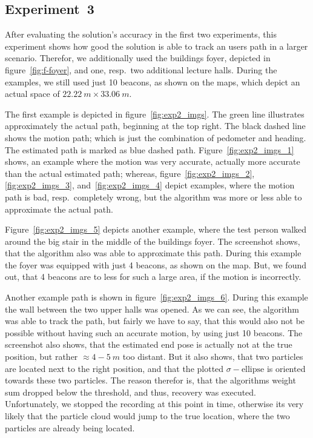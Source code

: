 \subsection*{Experiment~3}
After evaluating the solution's accuracy in the first two experiments, this experiment shows how good the solution is able to track an users path in a larger scenario. Therefor, we additionally used the buildings foyer, depicted in figure~\ref{fig:f-foyer}, and one, resp.\ two additional lecture halls. During the examples, we still used just 10 beacons, as shown on the maps, which depict an actual space of $22.22~m \times 33.06~m$.

The first example is depicted in figure~\ref{fig:exp2_imgs}. The green line illustrates approximately the actual path, beginning at the top right. The black dashed line shows the motion path; which is just the combination of pedometer and heading. The estimated path is marked as blue dashed path. Figure~\ref{fig:exp2_imgs_1} shows, an example where the motion was very accurate, actually more accurate than the actual estimated path; whereas, figure~\ref{fig:exp2_imgs_2}, \ref{fig:exp2_imgs_3}, and~\ref{fig:exp2_imgs_4} depict examples, where the motion path is bad, resp.\ completely wrong, but the algorithm was more or less able to approximate the actual path.

Figure~\ref{fig:exp2_imgs_5} depicts another example, where the test person walked around the big stair in the middle of the buildings foyer. The screenshot shows, that the algorithm also was able to approximate this path. During this example the foyer was equipped with just 4 beacons, as shown on the map. But, we found out, that 4 beacons are to less for such a large area, if the motion is incorrectly.

Another example path is shown in figure~\ref{fig:exp2_imgs_6}. During this example the wall between the two upper halls was opened. As we can see, the algorithm was able to track the path, but fairly we have to say, that this would also not be possible without having such an accurate motion, by using just 10 beacons. The screenshot also shows, that the estimated end pose is actually not at the true position, but rather $\approx 4-5~m$ too distant. But it also shows, that two particles are located next to the right position, and that the plotted $\sigma-\text{ellipse}$ is oriented towards these two particles.  The reason therefor is, that the algorithms weight sum dropped below the threshold, and thus, recovery was executed. Unfortunately, we stopped the recording at this point in time, otherwise its very likely that the particle cloud would jump to the true location, where the two particles are already being located. 


